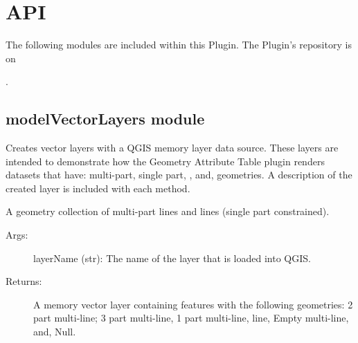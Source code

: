 \documentclass[a4paper,11pt,english]{sphinxmanual}
\begin{document}
\chapter{API}
\label{\detokenize{API:api}}\label{\detokenize{API::doc}}
The following modules are included within this Plugin.  The Plugin’s repository is
on %
\begin{footnote}[17]\sphinxAtStartFootnote
{}
%
\end{footnote}.


\section{modelVectorLayers module}
\label{\detokenize{API:module-modelVectorLayers}}\label{\detokenize{API:modelvectorlayers-module}}\label{\detokenize{API:modelvectorlayers-api}}
Creates vector layers with a QGIS memory layer data source.  These layers are intended to demonstrate how the Geometry Attribute Table
plugin renders datasets that have: multi-part, single part, , and,  geometries.  A description of the created layer is included with each method.

\begin{fulllineitems}
\label{\detokenize{API:modelVectorLayers.createMultiLines}}
A geometry collection of multi-part lines and lines (single part constrained).
\begin{description}
\item[{Args:}] \leavevmode
layerName (str): The name of the layer that is loaded into QGIS.

\item[{Returns:}] \leavevmode
A memory vector layer containing features with the following geometries: 2 part multi-line; 3 part multi-line,
1 part multi-line, line, Empty multi-line, and, Null.

\end{description}

\end{fulllineitems}
\end{document}
